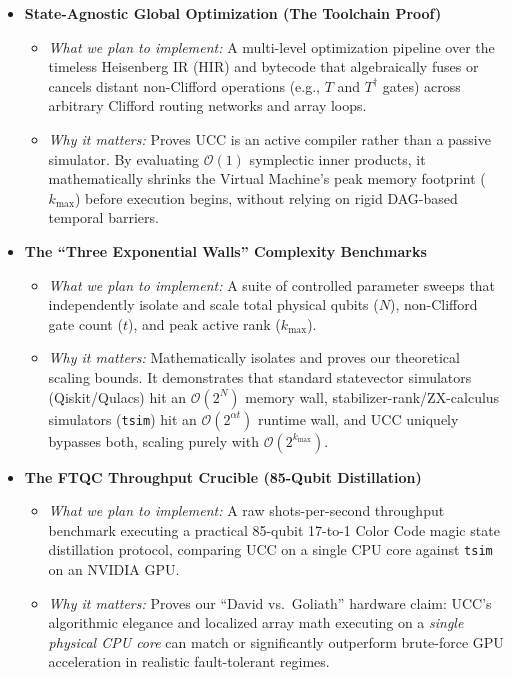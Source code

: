 \documentclass[11pt]{article}
\begin{document}
\begin{itemize}
    \item \textbf{State-Agnostic Global Optimization (The Toolchain Proof)}
    \begin{itemize}
        \item \textit{What we plan to implement:} A multi-level optimization pipeline over the timeless Heisenberg IR (HIR) and bytecode that algebraically fuses or cancels distant non-Clifford operations (e.g., $T$ and $T^\dagger$ gates) across arbitrary Clifford routing networks and array loops.
        \item \textit{Why it matters:} Proves UCC is an active compiler rather than a passive simulator. By evaluating $\mathcal{O}(1)$ symplectic inner products, it mathematically shrinks the Virtual Machine's peak memory footprint ($k_{\max}$) before execution begins, without relying on rigid DAG-based temporal barriers.
    \end{itemize}

    \item \textbf{The ``Three Exponential Walls'' Complexity Benchmarks}
    \begin{itemize}
        \item \textit{What we plan to implement:} A suite of controlled parameter sweeps that independently isolate and scale total physical qubits ($N$), non-Clifford gate count ($t$), and peak active rank ($k_{\max}$).
        \item \textit{Why it matters:} Mathematically isolates and proves our theoretical scaling bounds. It demonstrates that standard statevector simulators (Qiskit/Qulacs) hit an $\mathcal{O}(2^N)$ memory wall, stabilizer-rank/ZX-calculus simulators (\texttt{tsim}) hit an $\mathcal{O}(2^{\alpha t})$ runtime wall, and UCC uniquely bypasses both, scaling purely with $\mathcal{O}(2^{k_{\max}})$.
    \end{itemize}

    \item \textbf{The FTQC Throughput Crucible (85-Qubit Distillation)}
    \begin{itemize}
        \item \textit{What we plan to implement:} A raw shots-per-second throughput benchmark executing a practical 85-qubit 17-to-1 Color Code magic state distillation protocol, comparing UCC on a single CPU core against \texttt{tsim} on an NVIDIA GPU.
        \item \textit{Why it matters:} Proves our ``David vs.\ Goliath'' hardware claim: UCC's algorithmic elegance and localized array math executing on a \textit{single physical CPU core} can match or significantly outperform brute-force GPU acceleration in realistic fault-tolerant regimes.
    \end{itemize}


\end{itemize}
\end{document}
